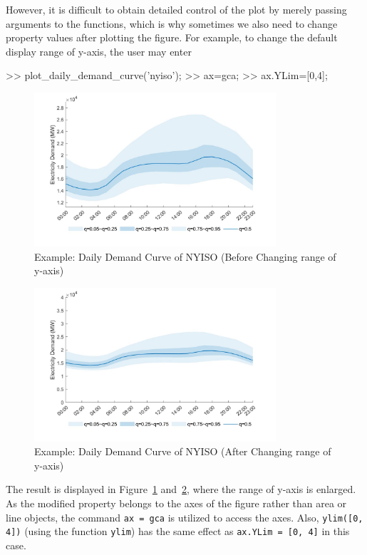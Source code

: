 \documentclass[10pt]{article}
\numberwithin{equation}{section}
\numberwithin{table}{section}
\numberwithin{figure}{section}
\begin{document}
However, it is difficult to obtain detailed control of the plot by merely passing arguments to the functions, which is why sometimes we also need to change property values after plotting the figure. For example, to change the default display range of y-axis, the user may enter

\begin{Code}
>> plot_daily_demand_curve('nyiso');
>> ax=gca;
>> ax.YLim=[0,4];
\end{Code}

\begin{figure}
  \centering
  \noindent\includegraphics[width=0.8\textwidth]{figures/visualization_example5_1.jpg}
  \caption{Example: Daily Demand Curve of NYISO (Before Changing range of y-axis)} \label{fig:vis_eg5_1}
\end{figure}

\begin{figure}
  \centering
  \noindent\includegraphics[width=0.8\textwidth]{figures/visualization_example5_2.jpg}
  \caption{Example: Daily Demand Curve of NYISO (After Changing range of y-axis)} \label{fig:vis_eg5_2}
\end{figure}

The result is displayed in Figure~\ref{fig:vis_eg5_1} and~\ref{fig:vis_eg5_2}, where the range of y-axis is enlarged. As the modified property belongs to the axes of the figure rather than area or line objects, the command \verb!ax = gca! is utilized to access the axes. Also, \verb!ylim([0, 4])! (using the function \verb!ylim!) has the same effect as \verb!ax.YLim = [0, 4]! in this case.
\end{document}
